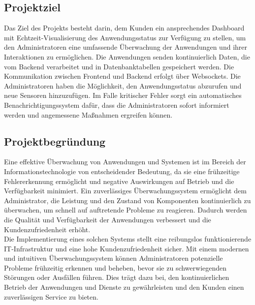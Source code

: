 \begin{flushleft}
	\subsection{Projektziel}
	Das Ziel des Projekts besteht darin, dem Kunden ein ansprechendes Dashboard mit Echtzeit-Visualisierung des Anwendungsstatus zur Verfügung zu stellen,
	um den Administratoren eine umfassende Überwachung der Anwendungen und ihrer Interaktionen zu ermöglichen.
	Die Anwendungen senden kontinuierlich Daten, die vom Backend verarbeitet und in Datenbanktabellen gespeichert werden.
	Die Kommunikation zwischen Frontend und Backend erfolgt über Websockets.
	Die Administratoren haben die Möglichkeit, den Anwendungsstatus abzurufen und neue Sensoren hinzuzufügen.
	Im Falle kritischer Fehler sorgt ein automatisches Benachrichtigungssystem dafür, dass die Administratoren sofort informiert werden und angemessene Maßnahmen ergreifen können.

	\subsection{Projektbegründung}
	Eine effektive Überwachung von Anwendungen und Systemen ist im Bereich der Informationstechnologie von entscheidender Bedeutung, da sie eine frühzeitige Fehlererkennung ermöglicht und negative Auswirkungen auf Betrieb und die Verfügbarkeit minimiert. Ein zuverlässiges Überwachungssystem ermöglicht dem Administrator, die Leistung und den Zustand von Komponenten kontinuierlich zu überwachen, um schnell auf auftretende Probleme zu reagieren. Dadurch werden die Qualität und Verfügbarkeit der Anwendungen verbessert und die Kundenzufriedenheit erhöht.
	\\
	Die Implementierung eines solchen Systems stellt eine reibungslos funktionierende IT-Infrastruktur und eine hohe Kundenzufriedenheit sicher. Mit einem modernen und intuitiven Überwachungssystem können Administratoren potenzielle Probleme frühzeitig erkennen und beheben, bevor sie zu schwerwiegenden Störungen oder Ausfällen führen. Dies trägt dazu bei, den kontinuierlichen Betrieb der Anwendungen und Dienste zu gewährleisten und den Kunden einen zuverlässigen Service zu bieten.


\end{flushleft}
